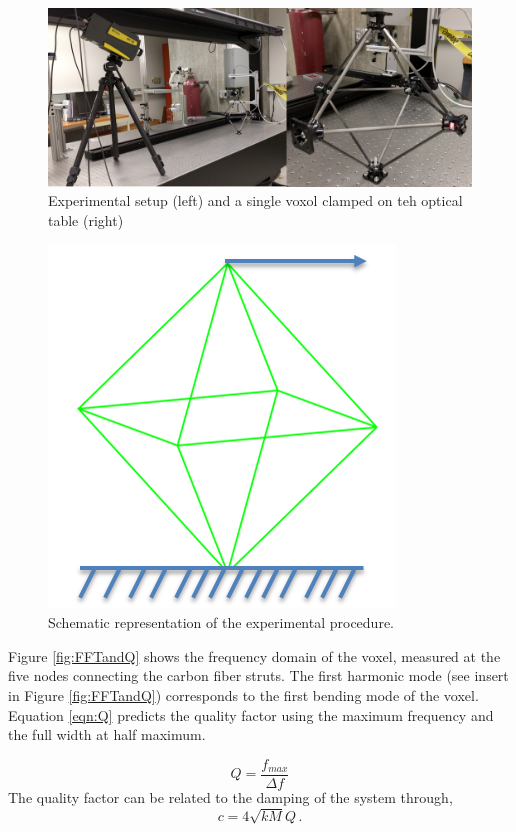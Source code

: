 \documentclass[11pt]{ucthesis}
\begin{document}
\begin{figure}[h]
\centering
\includegraphics[width=0.75\linewidth]{Figures/experimentalSetup.png}
\caption{Experimental setup (left) and a single voxol clamped on teh optical table (right)}
\label{fig:setUp}
\end{figure}

\begin{figure}[h]
\centering
\includegraphics[width=0.25\linewidth]{Figures/experimentalSetupDiagram.png}
\caption{Schematic representation of the experimental procedure. }
\label{fig:setUpD}
\end{figure}
Figure \ref{fig:FFTandQ} shows the frequency domain of the voxel, measured at the five nodes connecting the carbon fiber struts. The first harmonic mode (see insert in Figure \ref{fig:FFTandQ}) corresponds to the first bending mode of the voxel. Equation \ref{eqn:Q} predicts the quality factor using the maximum frequency and the full width at half maximum.

\begin{equation}
Q = \frac{f_{max}}{\Delta f}
\label{eqn:Q}
\end{equation}
The quality factor can be related to the damping of the system through,
\begin{equation}
c = 4 \sqrt{k M} Q \,.
\label{eqn:Q2c}
\end{equation}
\end{document}
